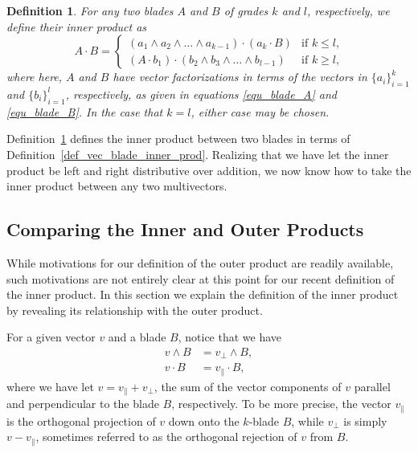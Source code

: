 \documentclass[12pt]{article}
\newtheorem{definition}{Definition}[section]
\begin{document}
\begin{definition}\label{def_blade_blade_inner_prod}
For any two blades $A$ and $B$ of grades $k$ and $l$, respectively,
we define their inner product as
\begin{equation}
A\cdot B = \left\{
\begin{array}{ll}
(a_1\wedge a_2\wedge\dots\wedge a_{k-1})\cdot (a_k\cdot B) & \mbox{if $k\leq l$,} \\
(A\cdot b_1)\cdot(b_2\wedge b_3\wedge\dots\wedge b_{l-1}) & \mbox{if $k\geq l$,}
\end{array}
\right.
\end{equation}
where here, $A$ and $B$ have vector factorizations in terms of the
vectors in $\{a_i\}_{i=1}^k$ and $\{b_i\}_{i=1}^l$, respectively,
as given in equations \eqref{equ_blade_A} and \eqref{equ_blade_B}.
In the case that $k=l$, either case may be chosen.
\end{definition}
Definition~\ref{def_blade_blade_inner_prod} defines the
inner product between two blades in terms of Definition~\ref{def_vec_blade_inner_prod}.
Realizing that we have let the inner product be left and right distributive
over addition, we now know how to take the inner product between
any two multivectors.

\subsection{Comparing the Inner and Outer Products}

While motivations for our definition of the outer product are readily available,
such motivations are not entirely clear at this point for our recent
definition of the inner product.  In this section we explain the
definition of the inner product by revealing its relationship with
the outer product.

For a given vector $v$ and a blade $B$, notice
that we have
\begin{align}
v\wedge B &= v_{\perp}\wedge B, \label{equ_v_op_B}\\
v\cdot B &= v_{\parallel}\cdot B,\label{equ_v_ip_B}
\end{align}
where we have let $v=v_{\parallel}+v_{\perp}$, the
sum of the vector components of $v$ parallel and
perpendicular to the blade $B$, respectively.  To be more precise,
the vector $v_{\parallel}$ is the orthogonal projection of $v$ down
onto the $k$-blade $B$, while $v_{\perp}$ is simply $v-v_{\parallel}$,
sometimes referred to as the orthogonal rejection of $v$ from $B$.
\end{document}
